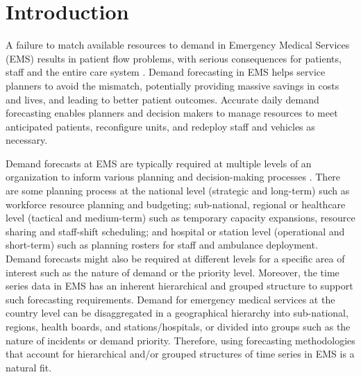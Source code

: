 \documentclass[
  authoryear,
  preprint,
  3p]{elsarticle}
\begin{document}
\hypertarget{sec-intro}{%
\section{Introduction}\label{sec-intro}}

A failure to match available resources to demand in Emergency Medical
Services (EMS) results in patient flow problems, with serious
consequences for patients, staff and the entire care system
\citep{ekstrom2015forecasting, ROSTAMITABAR20221197}. Demand forecasting
in EMS helps service planners to avoid the mismatch, potentially
providing massive savings in costs and lives, and leading to better
patient outcomes. Accurate daily demand forecasting enables planners and
decision makers to manage resources to meet anticipated patients,
reconfigure units, and redeploy staff and vehicles as necessary.

Demand forecasts at EMS are typically required at multiple levels of an
organization to inform various planning and decision-making processes
\citep{hulshof2012taxonomic}. There are some planning process at the
national level (strategic and long-term) such as workforce resource
planning and budgeting; sub-national, regional or healthcare level
(tactical and medium-term) such as temporary capacity expansions,
resource sharing and staff-shift scheduling; and hospital or station
level (operational and short-term) such as planning rosters for staff
and ambulance deployment. Demand forecasts might also be required at
different levels for a specific area of interest such as the nature of
demand or the priority level. Moreover, the time series data in EMS has
an inherent hierarchical and grouped structure to support such
forecasting requirements. Demand for emergency medical services at the
country level can be disaggregated in a geographical hierarchy into
sub-national, regions, health boards, and stations/hospitals, or divided
into groups such as the nature of incidents or demand priority.
Therefore, using forecasting methodologies that account for hierarchical
and/or grouped structures of time series in EMS is a natural fit.
\end{document}
